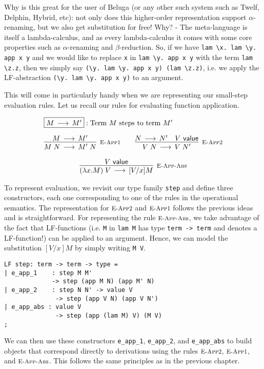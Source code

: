 Why is this great for the user of Beluga (or any other such system such as Twelf, Delphin, Hybrid, etc): not only does this higher-order representation support $\alpha$-renaming, but we also get substitution for free! Why?  - The meta-language is itself a lambda-calculus, and as every lambda-calculus it comes with some core properties such as $\alpha$-renaming and $\beta$-reduction. So, if we
have \lstinline!lam \x. lam \y. app x y! and we would like to replace
\lstinline!x! in \lstinline!lam \y. app x y! with the term
\lstinline!lam \z.z!, then we simply say
\lstinline!(\y. lam \y. app x y) (lam \z.z)!, i.e. we apply the
LF-abstraction \lstinline!(\y. lam \y. app x y)! to an argument.

This will come in particularly handy when we are representing our small-step
evaluation rules. Let us recall our rules for evaluating function application.

\[
\begin{array}{c}
\multicolumn{1}{l}{\fbox{$M \Steps M'$}: \mbox{Term $M$ steps to term $M'$}}
\\[1em]
\infer[\EAppFnStep]{M \app N \Steps M'\;N}{M \Steps M'} \qquad
\infer[\EAppArgStep]{V \app N \Steps V\;N'}{N \Steps N' & V \Value}
\\[1em]
\infer[\EAppBeta]{(\lam x.M) \app V \Steps [V/x]M}{V \Value}
\end{array}
\]

To represent evaluation, we revisit our type family
\lstinline!step! and define three constructors, each one corresponding to one of
the rules in the operational semantics. The representation for $\textsc{\footnotesize E-App2}$
and $\textsc{\footnotesize E-App1}$ follows the previous ideas and is straightforward. For
representing the rule $\textsc{\footnotesize E-App-Abs}$, we take advantage of the fact that
LF-functions (i.e. \lstinline!M! in \lstinline!lam M! has type
\lstinline!term -> term! and denotes a LF-function!) can be applied to an
argument. Hence, we can model the substitution $[V/x]M$ by simply writing
\lstinline!M V!.

\begin{lstlisting}
LF step: term -> term -> type =
| e_app_1    : step M M'
             -> step (app M N) (app M' N)
| e_app_2    : step N N' -> value V
              -> step (app V N) (app V N')
| e_app_abs : value V
              -> step (app (lam M) V) (M V)
;
\end{lstlisting}

We can then use these constructors \lstinline!e_app_1!,
\lstinline!e_app_2!, and \lstinline!e_app_abs! to build objects that
correspond directly to derivations using the rules $\textsc{\footnotesize E-App2}$,
$\textsc{\footnotesize E-App1}$, and  $\textsc{\footnotesize E-App-Abs}$. This follows the same principles as in the
previous chapter.

